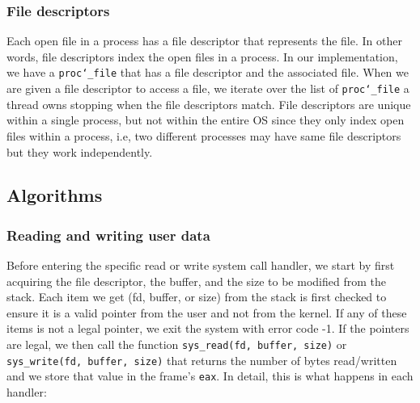 \documentclass{article}
\renewcommand{\_}{\char`_}
\begin{document}
\subsubsection{File descriptors}
Each open file in a process has a file descriptor that represents the file. In other words, file descriptors index the open files in a process. In our implementation, we have a \texttt{proc\_file} that has a file descriptor and the associated file. When we are given a file descriptor to access a file, we iterate over the list of \texttt{proc\_file} a thread owns stopping when the file descriptors match.
File descriptors are unique within a single process, but not within the entire OS since they only index open files within a process, i.e, two different processes may have same file descriptors but they work independently.

\subsection{Algorithms}

\subsubsection{Reading and writing user data}

Before entering the specific read or write system call handler, we start by first acquiring the file descriptor, the buffer, and the size to be modified from the stack. Each item we get (fd, buffer, or size) from the stack is first checked to ensure it is a valid pointer from the user and not from the kernel. If any of these items is not a legal pointer, we exit the system with error code -1.  If the pointers are legal, we then call the function \lstinline{sys_read(fd, buffer, size)} or \lstinline{sys_write(fd, buffer, size)} that returns the number of bytes read/written and we store that value in the frame's \texttt{eax}. In detail, this is what happens in each handler:
\end{document}
